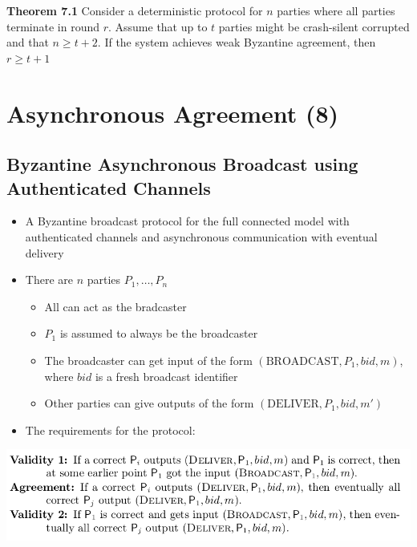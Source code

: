 \documentclass[11pt]{article}
\begin{document}
\textbf{Theorem 7.1} Consider a deterministic protocol for \(n\) parties where all parties terminate in round \(r\). Assume that up to \(t\) parties might be crash-silent corrupted and that \(n \geq t+2\). If the system achieves weak Byzantine agreement, then \(r \geq t+1\)  

\section{Asynchronous Agreement (8)}
\label{sec:org6ac48d6}
\subsection{Byzantine Asynchronous Broadcast using Authenticated Channels}
\label{sec:org2b8a711}
\begin{itemize}
\item A Byzantine broadcast protocol for the full connected model with authenticated channels and asynchronous communication with eventual delivery
\item There are \(n\) parties \(P_1, \dots, P_n\)
\begin{itemize}
\item All can act as the bradcaster
\item \(P_1\) is assumed to always be the broadcaster
\item The broadcaster can get input of the form \((\text{BROADCAST}, P_1, bid, m)\), where \(bid\) is a fresh broadcast identifier
\item Other parties can give outputs of the form \((\text{DELIVER}, P_1, bid, m')\)
\end{itemize}

\item The requirements for the protocol:
\end{itemize}
\begin{center}
\includegraphics[width=.9\linewidth]{Asynchronous Agreement (8)/screenshot_2018-09-29_16-58-36.png}
\end{center}
\end{document}
